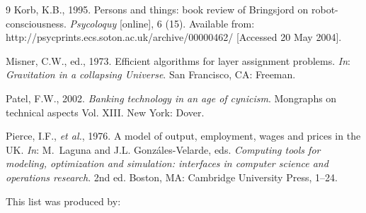 \documentclass[]{tGIS2e}
\begin{document}
\begin{thebibliography}{9}
Korb, K.B., 1995. Persons and things: book review of Bringsjord on
  robot-consciousness. {\itshape Psycoloquy} [online], 6 (15). Available from: http://psycprints.ecs.soton.ac.uk/archive/00000462/ [Accessed 20 May 2004].

Misner, C.W., ed., 1973. Efficient algorithms for layer assignment problems. {\itshape{In}}:
  {\itshape Gravitation in a collapsing Universe}. San Francisco, CA:
  Freeman.

Patel, F.W., 2002. {\itshape Banking technology in an age of cynicism}. Mongraphs on
  technical aspects Vol. XIII. New York: Dover.

Pierce, I.F., {\itshape{et al.}}, 1976. A
  model of output, employment, wages and prices in the UK. {\itshape{In}}: M.~Laguna and
  J.L. Gonz\'{a}les-Velarde, eds. {\itshape Computing tools for modeling, optimization and simulation: interfaces in
  computer science and operations research}. 2nd  ed. Boston, MA: Cambridge University
  Press, 1--24.
\end{thebibliography}
\medskip
\noindent This list was produced by:
\medskip
\end{document}
